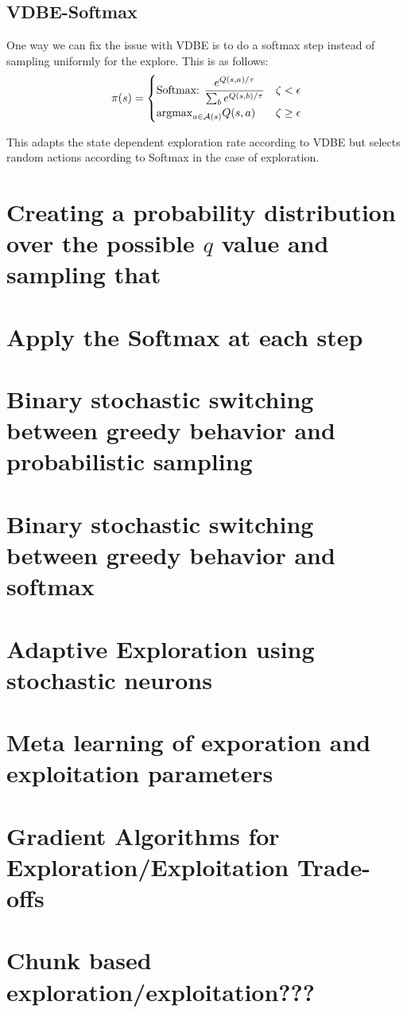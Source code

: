 \documentclass[10.5pt]{article}
\begin{document}
\subsection{VDBE-Softmax}
One way we can fix the issue with VDBE is to do a softmax step instead of sampling uniformly for the explore. This is as follows: 
\begin{equation}
\pi(s) = \begin{cases}
\text{Softmax: }\dfrac{e^{Q(s,a)/\tau}}{\sum_be^{Q(s,b)/\tau}} & \zeta < \epsilon \\
{\rm argmax}_{a\in {\cal A}(s)}Q(s,a) & \zeta \geq \epsilon
\end{cases}
\end{equation}

This adapts the state dependent exploration rate according to VDBE but selects random actions according to Softmax in the case of exploration. 

\section{Creating a probability distribution over the possible $q$ value and sampling that}

\section{Apply the Softmax at each step}

\section{Binary stochastic switching between greedy behavior and probabilistic sampling}

\section{Binary stochastic switching between greedy behavior and softmax}

\section{Adaptive Exploration using stochastic neurons}


\section{Meta learning of exporation and exploitation parameters}

\section{Gradient Algorithms for Exploration/Exploitation Trade-offs}

\section{Chunk based exploration/exploitation???}
\end{document}
